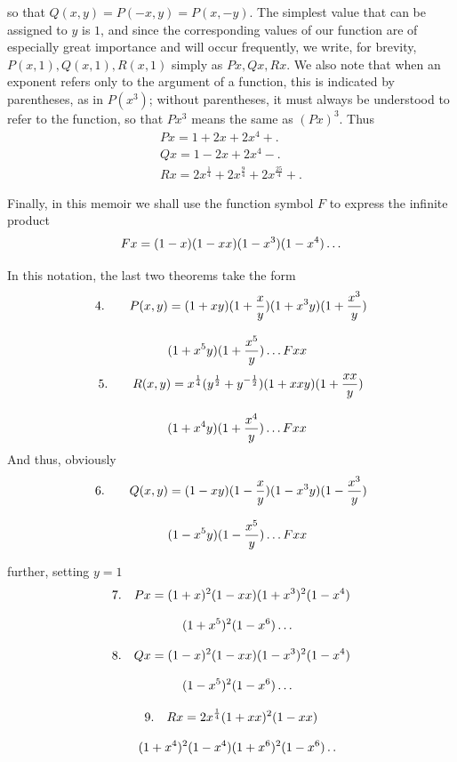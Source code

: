 so that $Q(x,y)=P(-x,y)=P(x,-y)$. The simplest value that can be assigned to $y$ is $1$, and since the corresponding values of our function are of especially great importance and will occur frequently, we write, for brevity, $P(x,1),Q(x,1),R(x,1)$ simply as $Px,Qx,Rx$. We also note that when an exponent refers only to the argument of a function, this is indicated by parentheses, as in $P(x^3)$; without parentheses, it must always be understood to refer to the function, so that $Px^3$ means the same as $(Px)^3$. Thus
\[
\begin{gathered}
Px=1+2x+2x^4+\mathord{.}\\[8pt]
Qx=1-2x+2x^4-\mathord{.}\\[8pt]
Rx=2x^{\frac14}+2x^{\frac94}+2x^{\frac{25}4}+\mathord{.}
\end{gathered}
\]

Finally, in this memoir we shall use the function symbol $F$ to express the infinite product
\[
Fx=(1-x)(1-xx)(1-x^3)(1-x^4)\mathinner{.\,.\,.}
\]

In this notation, the last two theorems take the form
\[
\begin{gathered}\text{4.}\qquad P(x,y)=(1+xy)(1+\frac xy)(1+x^3y)(1+\frac{x^3}y)\\[8pt]\quad{}(1+x^5y)(1+\frac{x^5}y)\mathinner{.\,.\,.} Fxx\end{gathered}
\]
\[
\begin{gathered}\text{5.}\qquad R(x,y)=x^{\frac14}(y^{\frac12}+y^{-\frac12})(1+xxy)(1+\frac{xx}y)\\[8pt]\quad{}(1+x^4y)(1+\frac{x^4}y)\mathinner{.\,.\,.} Fxx\end{gathered}
\]
And thus, obviously
\[
\begin{gathered}\text{6.}\qquad Q(x,y)=(1-xy)(1-\frac xy)(1-x^3y)(1-\frac{x^3}y)\\[8pt]\quad{}(1-x^5y)(1-\frac{x^5}y)\mathinner{.\,.\,.} Fxx\end{gathered}
\]







further, setting $y=1$
\[
\begin{gathered}
7.\quad Px=(1+x)^2(1-xx)(1+x^3)^2(1-x^4)\\[8pt]\quad{}(1+x^5)^2(1-x^6)\mathinner{.\,.\,.}\\[8pt]
8.\quad Qx=(1-x)^2(1-xx)(1-x^3)^2(1-x^4)\\[8pt]\quad{}(1-x^5)^2(1-x^6)\mathinner{.\,.\,.}\\[8pt]
9.\quad Rx=2x^{\frac14}(1+xx)^2(1-xx)\\[8pt]\quad{}(1+x^4)^2(1-x^4)(1+x^6)^2(1-x^6)\mathinner{.\,.}
\end{gathered}
\]

